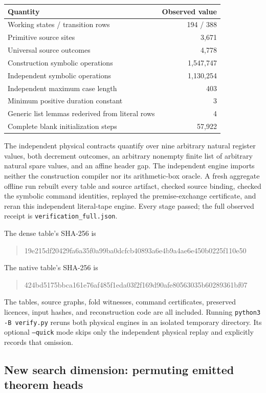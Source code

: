\begin{center}
\begin{tabular}{lr}
\toprule
Quantity & Observed value\\
\midrule
Working states / transition rows&194 / 388\\
Primitive source sites&3,671\\
Universal source outcomes&4,778\\
Construction symbolic operations&1,547,747\\
Independent symbolic operations&1,130,254\\
Independent maximum case length&403\\
Minimum positive duration constant&3\\
Generic list lemmas rederived from literal rows&4\\
Complete blank initialization steps&57,922\\
\bottomrule
\end{tabular}
\end{center}

The independent physical contracts quantify over nine arbitrary natural
register values, both decrement outcomes, an arbitrary nonempty finite
list of arbitrary natural spare values, and an affine header gap. The
independent engine imports neither the construction compiler nor its
arithmetic-box oracle. A fresh aggregate offline run rebuilt every table
and source artifact, checked source binding, checked the symbolic command
identities, replayed the premise-exchange certificate, and reran this
independent literal-tape engine. Every stage passed; the full observed
receipt is \texttt{verification\_full.json}.

The dense table's SHA-256 is
\begin{quote}\small\ttfamily
19e215df20429fa6a35f0a99ba0dcfcb40893a6e4b9a4ae6e450b0225f110e50
\end{quote}
The native table's SHA-256 is
\begin{quote}\small\ttfamily
424bd5175bbca161e76af485f1eda03f2f169d90afe80563035b60289361bf07
\end{quote}
The tables, source graphs, fold witnesses, command certificates, preserved
licences, input hashes, and reconstruction code are all included. Running
\texttt{python3 -B verify.py} reruns both physical engines in an isolated
temporary directory. Its optional \texttt{--quick} mode skips only the
independent physical replay and explicitly records that omission.

\subsection{New search dimension: permuting emitted theorem heads}

